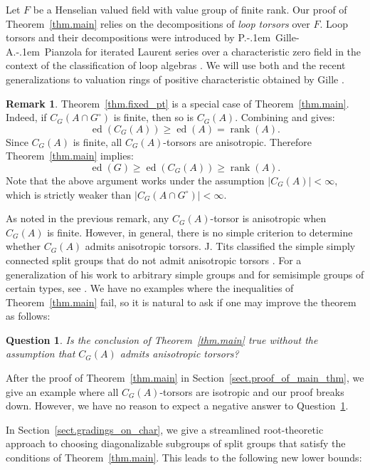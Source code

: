 \documentclass[12pt]{amsart}
\numberwithin{equation}{section}
\newtheorem{question}[theorem]{Question}
\theoremstyle{definition}
\newtheorem{remark}[theorem]{Remark}
\newcommand{\ed}{\operatorname{ed}}
\newcommand{\rank}{\operatorname{rank}}
\begin{document}
Let $F$ be a Henselian valued field with value group of finite rank. Our proof of Theorem~\ref{thm.main} relies on the decompositions of \emph{loop torsors} over $F$. Loop torsors and their decompositions were introduced by P.\kern-.1em\ Gille-A.\kern-.1em\ Pianzola for iterated Laurent series over a characteristic zero field in the context of the classification of loop algebras \cite{gille2013torsors}. We will use both \cite{gille2013torsors} and the recent generalizations to valuation rings of positive characteristic obtained by Gille \cite{gille2024newloop}. 

\begin{remark}
    Theorem~\ref{thm.fixed_pt} is a special case of Theorem~\ref{thm.main}. Indeed,
    if $C_G(A\cap G^{\circ})$ is finite, then so is $C_G(A)$.  
    Combining \cite[Lemma 4.1]{buhler1997essential} and \cite[Theorem 6]{buhler1997essential} gives:
$$\ed(C_G(A))\geq \ed(A) = \rank(A).$$ 
Since $C_G(A)$ is finite, all $C_G(A)$-torsors are anisotropic. Therefore Theorem~\ref{thm.main} implies:
    $$\ed(G) \geq \ed(C_G(A))\geq \rank(A).$$
Note that the above argument works under the assumption $|C_G(A)| <\infty$, which is strictly weaker than $|C_G(A\cap G^{\circ})|<\infty$.
\end{remark} 

As noted in the previous remark, any $C_G(A)$-torsor is anisotropic when $C_G(A)$ is finite. However, in general, there is no simple criterion to determine whether $C_G(A)$ admits anisotropic torsors. J. Tits classified the simple simply connected split groups that do not admit anisotropic torsors \cite{tits1990strongly}. For a generalization of his work to arbitrary simple groups and for semisimple groups of certain types, see \cite{ofek2022reduction}.
We have no examples where the inequalities of Theorem~\ref{thm.main} fail, so it is natural to ask if one may improve the theorem as follows:
\begin{question}\label{question1}
    Is the conclusion of Theorem~\ref{thm.main} true without the assumption that $C_G(A)$ admits anisotropic torsors?
\end{question}
After the proof of Theorem~\ref{thm.main} in Section~\ref{sect.proof_of_main_thm}, we give an example where all $C_G(A)$-torsors are isotropic and our proof breaks down. However, we have no reason to expect a negative answer to Question~\ref{question1}.

In Section~\ref{sect.gradings_on_char}, we give a streamlined root-theoretic approach to choosing diagonalizable subgroups of split groups that satisfy the conditions of Theorem~\ref{thm.main}. This leads to the following new lower bounds:
\end{document}
